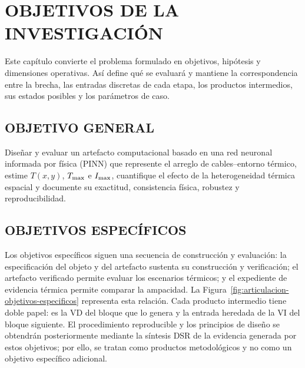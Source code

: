 \chapter{OBJETIVOS DE LA INVESTIGACIÓN}
\thispagestyle{empty}

Este capítulo convierte el problema formulado en objetivos, hipótesis y dimensiones operativas. Así define qué se evaluará y mantiene la correspondencia entre la brecha, las entradas discretas de cada etapa, los productos intermedios, sus estados posibles y los parámetros de caso.

\section{OBJETIVO GENERAL}

Diseñar y evaluar un artefacto computacional basado en una red neuronal informada por física (PINN) que represente el arreglo de cables--entorno térmico, estime $T(x,y)$, $T_{\max}$ e $I_{\max}$, cuantifique el efecto de la heterogeneidad térmica espacial y documente su exactitud, consistencia física, robustez y reproducibilidad.

\section{OBJETIVOS ESPECÍFICOS}

Los objetivos específicos siguen una secuencia de construcción y evaluación: la especificación del objeto y del artefacto sustenta su construcción y verificación; el artefacto verificado permite evaluar los escenarios térmicos; y el expediente de evidencia térmica permite comparar la ampacidad. La Figura~\ref{fig:articulacion-objetivos-especificos} representa esta relación. Cada producto intermedio tiene doble papel: es la VD del bloque que lo genera y la entrada heredada de la VI del bloque siguiente. El procedimiento reproducible y los principios de diseño se obtendrán posteriormente mediante la síntesis DSR de la evidencia generada por estos objetivos; por ello, se tratan como productos metodológicos y no como un objetivo específico adicional.

